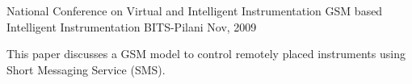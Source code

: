 \begin{cventries}
  \cventry
    {National Conference on Virtual and Intelligent Instrumentation} %
    {GSM based Intelligent Instrumentation} %
    {BITS-Pilani} %
    {Nov, 2009} %
    {
      \begin{cvitems} %
        \item {This paper discusses a GSM model to control remotely placed instruments using Short
    Messaging Service (SMS).}
      \end{cvitems}		
    }
    
    
    

   
\end{cventries}
